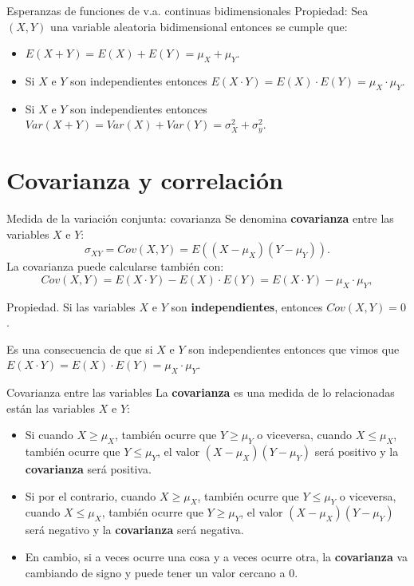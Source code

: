 \documentclass[
  ignorenonframetext,
]{beamer}
\providecommand{\tightlist}{%
  \setlength{\itemsep}{0pt}\setlength{\parskip}{0pt}}
\begin{document}
\begin{frame}{Esperanzas de funciones de v.a. continuas bidimensionales}
\protect\hypertarget{esperanzas-de-funciones-de-v.a.-continuas-bidimensionales-2}{}
Propiedad: Sea \((X,Y)\) una variable aleatoria bidimensional entonces
se cumple que:

\begin{itemize}
\tightlist
\item
  \(E(X+Y)=E(X)+E(Y)=\mu_X+ \mu_Y\).
\item
  Si \(X\) e \(Y\) son independientes entonces
  \(E(X\cdot Y)=E(X)\cdot E(Y)=\mu_X\cdot \mu_Y\).
\item
  Si \(X\) e \(Y\) son independientes entonces
  \(Var(X+Y)=Var(X)+ Var(Y)=\sigma_X^2+ \sigma_y^2\).
\end{itemize}
\end{frame}

\hypertarget{covarianza-y-correlaciuxf3n}{%
\section{Covarianza y correlación}\label{covarianza-y-correlaciuxf3n}}

\begin{frame}{Medida de la variación conjunta: covarianza}
\protect\hypertarget{medida-de-la-variaciuxf3n-conjunta-covarianza}{}
Se denomina \textbf{covarianza} entre las variables \(X\) e \(Y\): \[
\sigma_{XY}=Cov(X,Y)=E((X-\mu_X)(Y-\mu_Y)).
\] La covarianza puede calcularse también con: \[
Cov(X,Y)=E(X\cdot Y)-E(X)\cdot E(Y)=E(X\cdot Y)-\mu_X\cdot \mu_Y,
\]

Propiedad. Si las variables \(X\) e \(Y\) son \textbf{independientes},
entonces \(Cov(X,Y)=0\).

Es una consecuencia de que si \(X\) e \(Y\) son independientes entonces
que vimos que \(E(X\cdot Y)=E(X)\cdot E(Y) =\mu_X\cdot \mu_Y\).
\end{frame}

\begin{frame}{Covarianza entre las variables}
\protect\hypertarget{covarianza-entre-las-variables}{}
La \textbf{covarianza} es una medida de lo relacionadas están las
variables \(X\) e \(Y\):

\begin{itemize}
\item
  Si cuando \(X\geq \mu_X\), también ocurre que \(Y\geq \mu_Y\) o
  viceversa, cuando \(X\leq \mu_X\), también ocurre que \(Y\leq \mu_Y\),
  el valor \((X-\mu_X)(Y-\mu_Y)\) será positivo y la \textbf{covarianza}
  será positiva.
\item
  Si por el contrario, cuando \(X\geq \mu_X\), también ocurre que
  \(Y\leq \mu_Y\) o viceversa, cuando \(X\leq \mu_X\), también ocurre
  que \(Y\geq \mu_Y\), el valor \((X-\mu_X)(Y-\mu_Y)\) será negativo y
  la \textbf{covarianza} será negativa.
\item
  En cambio, si a veces ocurre una cosa y a veces ocurre otra, la
  \textbf{covarianza} va cambiando de signo y puede tener un valor
  cercano a 0.
\end{itemize}
\end{frame}
\end{document}
